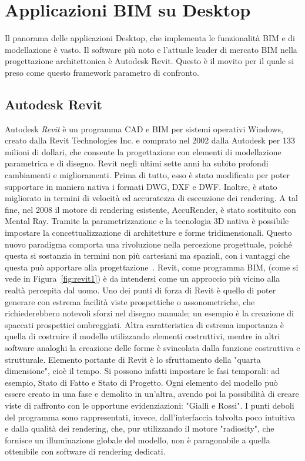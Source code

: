 \section{Applicazioni BIM su Desktop}
\label{sec:chapter_1_section_2}
Il panorama delle applicazioni Desktop, che implementa le funzionalità BIM e di modellazione è vasto.
Il software più noto e l’attuale leader di mercato BIM nella
progettazione architettonica è Autodesk Revit. Questo è il movito per il quale si
preso come questo framework parametro di confronto.

\subsection*{Autodesk Revit}
\label{sec:chapter_1_section_2_sub_1}
Autodesk \emph{Revit} è un programma CAD e BIM per sistemi operativi Windows, creato dalla Revit Technologies Inc. e comprato
nel 2002 dalla Autodesk per 133 milioni di dollari, che consente la progettazione con elementi di modellazione parametrica
e di disegno.
Revit negli ultimi sette anni ha subito profondi cambiamenti e miglioramenti. Prima di tutto, esso è stato modificato per poter
supportare in maniera nativa i formati DWG, DXF e DWF. Inoltre, è stato migliorato in termini di velocità ed accuratezza di
esecuzione dei rendering. A tal fine, nel 2008 il motore di rendering esistente, AccuRender, è stato sostituito con Mental Ray.
Tramite la parametrizzazione e la tecnologia 3D nativa è possibile impostare la concettualizzazione di architetture e forme
tridimensionali. Questo nuovo paradigma comporta una rivoluzione nella percezione progettuale, poiché questa si sostanzia in
termini non più cartesiani ma spaziali, con i vantaggi che questa può apportare alla progettazione~\cite{BIMrevolution}.
Revit, come programma BIM, (come si vede in Figura~\ref{fig:revit1}) è da intendersi come un approccio più vicino alla realtà
percepita dal uomo.
Uno dei punti di forza di Revit è quello di poter generare con estrema facilità viste prospettiche o assonometriche, che
richiederebbero notevoli sforzi nel disegno manuale; un esempio è la creazione di spaccati prospettici ombreggiati.
Altra caratteristica di estrema importanza è quella di costruire il modello utilizzando elementi costruttivi, mentre
in altri software analoghi la creazione delle forme è svincolata dalla funzione costruttiva e strutturale.
Elemento portante di Revit è lo sfruttamento della "quarta dimensione", cioè il tempo. Si possono infatti impostare le fasi
temporali: ad esempio, Stato di Fatto e Stato di Progetto. Ogni elemento del modello può essere creato in una fase e demolito
in un'altra, avendo poi la possibilità di creare viste di raffronto con le opportune evidenziazioni: "Gialli e Rossi".
I punti deboli del programma sono rappresentati, invece, dall'interfaccia talvolta poco intuitiva e dalla qualità dei rendering,
che, pur utilizzando il motore "radiosity", che fornisce un illuminazione globale del modello, non è paragonabile
a quella ottenibile con software di rendering dedicati.\\

